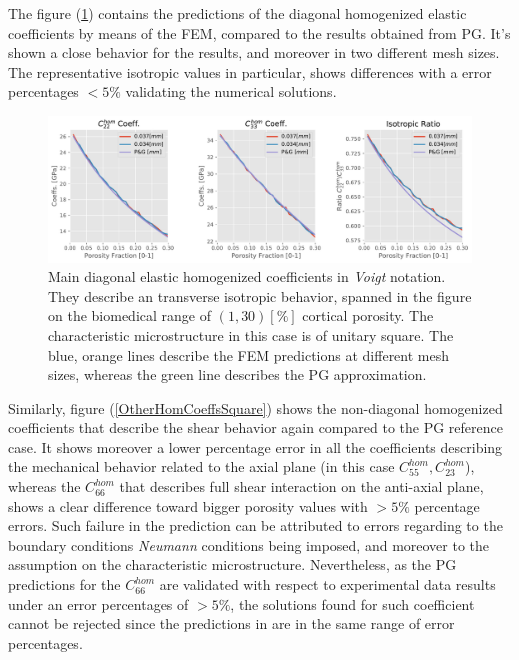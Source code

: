 The figure (\ref{MainHomCoeffsSquare}) contains the predictions of the diagonal homogenized elastic coefficients by means of the FEM, compared to the results obtained from PG. It's shown a close behavior for the results, and moreover in two different mesh sizes. The representative isotropic values in particular, shows differences with a error percentages $< 5 \%$ validating the numerical solutions.
\begin{figure}[!h]
	\centering
	\includegraphics[scale=.5]{images/CellsProb/CellProb_MainHomCoeffsCircular.pdf}
	\caption{Main diagonal elastic homogenized coefficients in \textit{Voigt} notation. They describe an transverse isotropic behavior, spanned in the figure on the biomedical range of $(1,30) [\%]$ cortical porosity. The characteristic microstructure in this case is of unitary square. The blue, orange lines describe the FEM predictions at different mesh sizes, whereas the green line describes the PG approximation.}
	\label{MainHomCoeffsSquare}
\end{figure}
Similarly, figure (\ref{OtherHomCoeffsSquare}) shows the non-diagonal homogenized coefficients that describe the shear behavior again compared to the PG reference case. It shows moreover a lower percentage error in all the coefficients describing the mechanical behavior related to the axial plane (in this case $C_{55}^{hom}, C_{23}^{hom}$), whereas the $C_{66}^{hom}$ that describes full shear interaction on the anti-axial plane, shows a clear difference toward bigger porosity values with $> 5\%$ percentage errors. 
Such failure in the prediction can be attributed to errors regarding to the boundary conditions \textit{Neumann} conditions being imposed, and moreover to the assumption on the characteristic microstructure. Nevertheless, as the PG predictions for the $C_{66}^{hom}$ are validated with respect to experimental data results under an error percentages of $> 5 \%$, the solutions found for such coefficient cannot be rejected since the predictions in are in the same range of error percentages.

